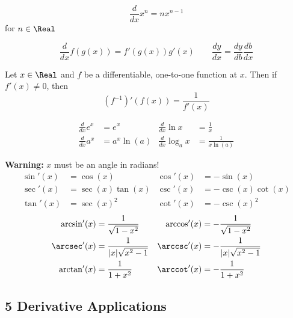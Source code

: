 \begin{theorem}
  \[
    \frac{d}{dx} x^n = nx^{n-1}
  \]
  for $n \in \Real$
\end{theorem}

\begin{theorem}
  \[
    \frac{d}{dx}f(g(x)) = f'(g(x))g'(x) \qquad \frac{dy}{dx} = \frac{dy}{db}\frac{db}{dx}
  \]
\end{theorem}

\begin{theorem}
  Let $x \in \Real$ and $f$ be a differentiable, one-to-one function at $x$. Then if $f'(x) \neq 0$, then
  \[
    (f^{-1})'(f(x)) = \frac{1}{f'(x)}
  \]
\end{theorem}

\begin{theorem}
  \[\begin{aligned}
    \frac{d}{dx} e^x &= e^x &
    \frac{d}{dx} \ln x &= \frac{1}{x} \\
    \frac{d}{dx} a^x &= a^x \ln(a)&
    \frac{d}{dx} \log_a x &= \frac{1}{x\ln(a)}
  \end{aligned}\]
\end{theorem}

\begin{theorem}\leavevmode\newline
  \textbf{Warning:} $x$ must be an angle in radians!
  \[\begin{aligned}
    \sin'(x) &= \cos(x) &
    \cos'(x) &= -\sin(x) \\
    \sec'(x) &= \sec(x)\tan(x) &
    \csc'(x) &= -\csc(x)\cot(x) \\
    \tan'(x) &= \sec(x)^2 &
    \cot'(x) &= -\csc(x)^2
  \end{aligned}\]
  \[\begin{aligned}
    \arcsin'(x) &= \frac{1}{\sqrt{1-x^2}} &
    \arccos'(x) &= -\frac{1}{\sqrt{1-x^2}} \\
    \arcsec'(x) &= \frac{1}{|x|\sqrt{x^2-1}} &
    \arccsc'(x) &= -\frac{1}{|x|\sqrt{x^2-1}} \\
    \arctan'(x) &= \frac{1}{1+x^2} &
    \arccot'(x) &= -\frac{1}{1+x^2}
  \end{aligned}\]
\end{theorem}

\subsection*{5 Derivative Applications}

